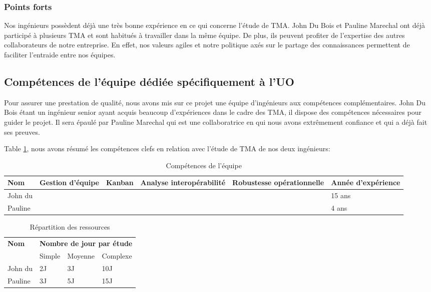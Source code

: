 	\subsubsection{Points forts}
	Nos ingénieurs possèdent déjà une très bonne expérience en ce qui concerne l’étude de TMA. John Du Bois et Pauline Marechal ont déjà participé à plusieurs TMA et sont habitués à travailler dans la même équipe. De plus, ils peuvent profiter de l’expertise des autres collaborateurs de notre entreprise. En effet, nos valeurs agiles et notre politique axés sur le partage des connaissances permettent de faciliter l’entraide entre nos équipes.
	
	\subsection{Compétences de l'équipe dédiée spécifiquement à l'UO}
	Pour assurer une prestation de qualité, nous avons mis sur ce projet une équipe d’ingénieurs aux compétences complémentaires. John Du Bois étant un ingénieur senior ayant acquis beaucoup d’expériences dans le cadre des TMA, il dispose des compétences nécessaires pour guider le projet. Il sera épaulé par Pauline Marechal qui est une collaboratrice en qui nous avons extrêmement confiance et qui a déjà fait ses preuves.
	
	Table \ref{table:competences1}, nous avons résumé les compétences clefs en relation avec l’étude de TMA de nos deux ingénieurs:
	
	\begin{table}[H]
			\centering
	\begin{tabular}{|p{3cm}|p{1.8cm}|c|p{3cm}|p{3cm}|p{3cm}|}
		\hline
		\textbf{Nom} & \textbf{Gestion d'équipe} & \textbf{Kanban} & \textbf{Analyse interopérabilité} & \textbf{Robustesse opérationnelle} & \textbf{Année d'expérience}\\
		\hline
		John du \bsc{Bois} & \checkmark & \checkmark &\checkmark  & & 15 ans\\
		\hline
		Pauline \bsc{Marechal} & &\checkmark  & &\checkmark  & 4 ans\\
		\hline
	\end{tabular}
	\caption{Compétences de l'équipe}
	\label{table:competences1}
	\end{table}
	
		\begin{table}[H]
			\centering
\begin{tabular}{|p{3cm}|p{3cm}|p{3cm}|p{3cm}|}
	\hline
\multirow{2}{*}{\textbf{Nom}}&\multicolumn{3}{c|}{\textbf{Nombre de jour par étude}}\\ 
\cline{2-4}
& Simple & Moyenne & Complexe \\ 
	\hline John du \bsc{Bois} & 2J & 3J & 10J \\ 
	\hline Pauline \bsc{Marechal} & 3J & 5J & 15J \\ 
	\hline 
\end{tabular} 
			\caption{Répartition des ressources}
			\label{table:ressources1}
		\end{table}
